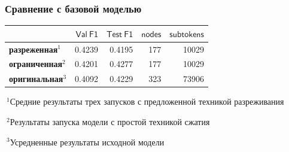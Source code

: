 \documentclass{beamer}
\begin{document}

\begin{frame}
\frametitle{Сравнение с базовой моделью}
\begin{table}[htbp]
	\tiny
	\centering
	\begin{tabular}{lrrrr}
		\toprule
		{} &  $\mathsf{Val\ F1}$ & $\mathsf{Test\ F1}$ &  $\mathsf{nodes}$ & $\mathsf{subtokens}$\\
		\midrule
		\textbf{разреженная$^{1}$} &  0.4239 &  0.4195 & 177 & 10029\\
		\textbf{ограниченная$^{2}$} & 0.4201 & 0.4277& 177 & 10029 \\
		\textbf{оригинальная$^{3}$} & 0.4092 & 0.4229 & 323 & 73906\\
		\bottomrule
	\end{tabular}
\end{table}


{
	\footnotesize
	$\ ^1$Средние результаты трех запусков с предложенной техникой разреживания
	
	$\ ^2$Результаты запуска модели с простой техникой сжатия
	
	$\ ^3$Усредненные результаты исходной модели
}
\end{frame}


\end{document}

